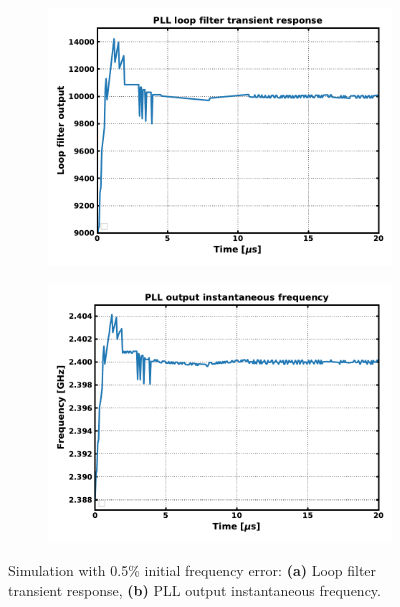 	\begin{figure}[htb!]
	    \centering
	    \begin{subfigure}{0.5\textwidth}
	        \centering
	        \center\includegraphics[width=1.0\textwidth, angle=0]{figs/trans_loop_filter_fast.pdf}
	        \caption{ }
	        \label{fig:trans_lf_fast}
	    \end{subfigure}%
	    \begin{subfigure}{0.5\textwidth}
	        \centering
	        \center\includegraphics[width=1.0\textwidth, angle=0]{figs/trans_inst_freq_fast.pdf}
	        \caption{ }
	        \label{fig:trans_inst_freq_fast}
	    \end{subfigure}
	    \label{fig:trans_sim1_fast}
	    \caption{Simulation with 0.5\% initial frequency error: \textbf{(a)} Loop filter transient response, \textbf{(b)} PLL output instantaneous frequency.}
	\end{figure}


